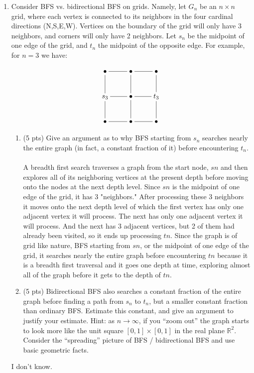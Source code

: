 \documentclass[12pt]{article}
\begin{document}
\begin{enumerate}
\begin{enumerate}
			
	\pagebreak
	
	\item \label{1c} Consider BFS vs. bidirectional BFS on grids. Namely, let $G_n$ be an $n \times n$ grid, where each vertex is connected to its neighbors in the four cardinal directions (N,S,E,W). Vertices on the boundary of the grid will only have 3 neighbors, and corners will only have 2 neighbors. Let $s_n$ be the midpoint of one edge of the grid, and $t_n$ the midpoint of the opposite edge. For example, for $n=3$ we have:
	
	\[
\xymatrix{
\bullet \ar@{-}[r] \ar@{-}[d] & \bullet \ar@{-}[r] \ar@{-}[d] & \bullet \ar@{-}[d] \\ 
s_3 \ar@{-}[r] \ar@{-}[d] & \bullet \ar@{-}[r] \ar@{-}[d] & t_3 \ar@{-}[d] \\ 
\bullet \ar@{-}[r] & \bullet \ar@{-}[r] & \bullet
}
\]

	\begin{enumerate}
	\item (5 pts) Give an argument as to why BFS starting from $s_n$ searches nearly the entire graph (in fact, a constant fraction of it) before encountering $t_n$. \\
	\\A breadth first search traverses a graph from the start node, $s{n}$ and then explores all of its neighboring vertices at the present depth before moving onto the nodes at the next depth level. Since $s{n}$ is the midpoint of one edge of the grid, it has 3 "neighbors." After processing these 3 neighbors it moves onto the next depth level of which the first vertex has only one adjacent vertex it will process. The next has only one adjacent vertex it will process. And the next has 3 adjacent vertices, but 2 of them had already been visited, so it ends up processing $t{n}$. Since the graph is of grid like nature, BFS starting from $s{n}$, or the midpoint of one edge of the grid, it searches nearly the entire graph before encountering $t{n}$ because it is a breadth first traversal and it goes one depth at time, exploring almost all of the graph before it gets to the depth of $t{n}$. \\

	\pagebreak
	
	\item (5 pts) Bidirectional BFS also searches a constant fraction of the entire graph before finding a path from $s_n$ to $t_n$, but a smaller constant fraction than ordinary BFS. Estimate this constant, and give an argument to justify your estimate. Hint: as $n \to \infty$, if you ``zoom out'' the graph starts to look more like the unit square $[0,1] \times [0,1]$ in the real plane $\mathbb{R}^2$. Consider the ``spreading'' picture of BFS / bidirectional BFS and use basic geometric facts.
	\end{enumerate}
	 I don't know. 
	\pagebreak
	

\end{enumerate}
\end{enumerate}
\end{document}
